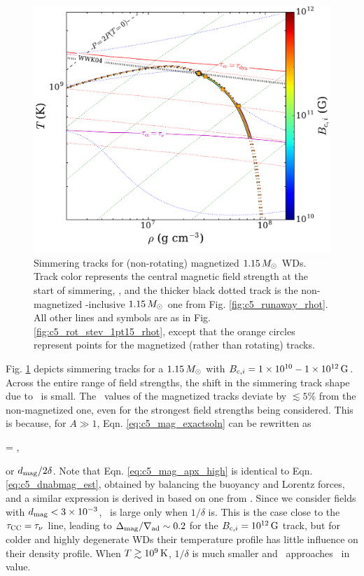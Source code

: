 
\begin{figure}
\centering
\includegraphics[angle=0,width=0.8\columnwidth]{chapter5_zhu+16/figures/mag_1pt15_rhot.pdf}
\caption{Simmering tracks for (non-rotating) magnetized $1.15\,\Msun$ WDs.  Track color represents the central magnetic field strength at the start of simmering, \Binit, and the thicker black dotted track is the non-magnetized \dnabconv-inclusive $1.15\,\Msun$ one from Fig. \ref{fig:c5_runaway_rhot}.  All other lines and symbols are as in Fig. \ref{fig:c5_rot_stev_1pt15_rhot}, except that the orange circles represent \citeal{wooswk04} points for the magnetized (rather than rotating) tracks.}
\label{fig:c5_mag_1pt15_rhot}
\end{figure}

Fig. \ref{fig:c5_mag_1pt15_rhot} depicts simmering tracks for a $1.15\,\Msun$ with $\Binit = 1\times10^{10}-1\times10^{12}\,\mrm{G}$.  Across the entire range of field strengths, the shift in the simmering track shape due to \dnabmag\ is small.  The \rhoc\ values of the magnetized tracks deviate by $\lesssim5$\% from the non-magnetized one, even for the strongest field strengths being considered.  This is because, for $A \gg 1$, Eqn. \ref{eq:c5_mag_exactsoln} can be rewritten as

\eqbegin
\dnabmag \approx {} = ,
\label{eq:c5_mag_apx_high}
\eqend

\noindent or $\dmag/2\delta$.  Note that Eqn. \ref{eq:c5_mag_apx_high} is identical to Eqn. \ref{eq:c5_dnabmag_est}, obtained by balancing the buoyancy and Lorentz forces, and a similar expression is derived in \cite{macdm09} based on one from \cite{gougt66}.  Since we consider fields with $\dmag < 3\times10^{-3}$, \dnabmag\ is large only when $1/\delta$ is.  This is the case close to the $\taucc = \taunu$ line, leading to $\dnabmag/\nablaad \sim 0.2$ for the $\Binit = 10^{12}\,\mrm{G}$ track, but for colder and highly degenerate WDs their temperature profile has little influence on their density profile.  When $T\gtrsim10^9\,\mathrm{K}$, $1/\delta$ is much smaller and \dnabmag\ approaches \dnabconv\ in value.

